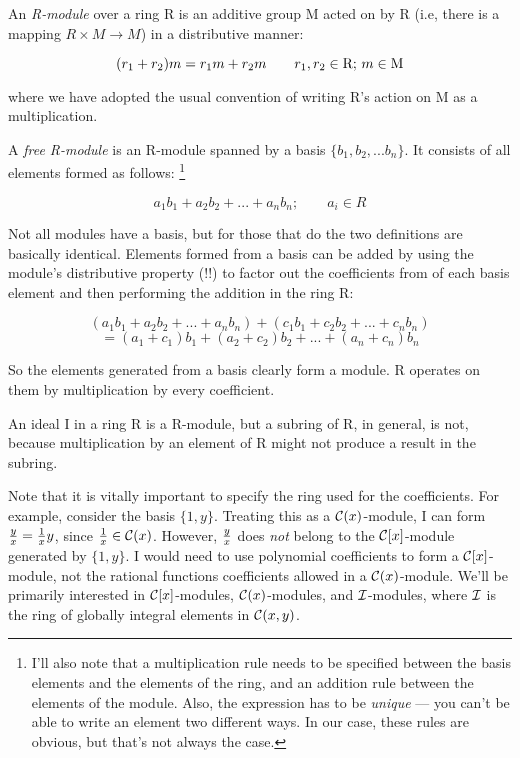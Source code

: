 
An {\it R-module} over a ring R is an additive group M acted on by R
(i.e, there is a mapping $R \times M \to M$) in a distributive manner:

$$(r_1 + r_2)m = r_1 m + r_2 m \qquad r_1, r_2 \in {\rm R};\, m \in {\rm M}$$

where we have adopted the usual convention of writing R's action on M
as a multiplication.

\enddefinition


A {\it free R-module} is an R-module spanned by a basis
$\{b_1, b_2, ... b_n\}$.  It consists of all elements formed as follows:
\footnote{I'll also note that a multiplication rule needs to be specified
between the basis elements and the elements of the ring, and an
addition rule between the elements of the module.  Also,
the expression has to be {\it unique} --- you can't be
able to write an element two different ways.  In our
case, these rules are obvious, but that's not always the case.}

	$$ a_1 b_1 + a_2 b_2 + ... + a_n b_n; \qquad a_i \in R $$


\enddefinition

Not all modules have a basis, but for those that do the two
definitions are basically identical.  Elements formed from a basis can
be added by using the module's distributive property (!!) to factor out the
coefficients from of each basis element and then performing the addition
in the ring R:

$$ (a_1 b_1 + a_2 b_2 + ... + a_n b_n) + (c_1 b_1 + c_2 b_2 + ... + c_n b_n) $$
$$  = (a_1 + c_1) b_1 + (a_2 + c_2) b_2 + ... + (a_n + c_n) b_n $$

So the elements generated from a basis clearly form a module.  R operates
on them by multiplication by every coefficient.

\example \quad

An ideal I in a ring R is a R-module, but a subring of R, in
general, is not, because multiplication by an element of R might
not produce a result in the subring.

\endexample


Note that it is vitally important to specify the ring used for the
coefficients.  For example, consider the basis $\{1, y\}$.  Treating
this as a ${\cal C}(x)$-module, I can form ${y \over x} = {1 \over x}
y$, since ${1 \over x} \in {\cal C}(x)$.  However, $y \over x$ does {\it
not} belong to the ${\cal C}[x]$-module generated by $\{1, y\}$.  I
would need to use polynomial coefficients to form a ${\cal
C}[x]$-module, not the rational functions coefficients allowed in a
${\cal C}(x)$-module.  We'll be primarily interested in ${\cal C}[x]$-modules,
${\cal C}(x)$-modules, and ${\cal I}$-modules, where ${\cal I}$ is the ring
of globally integral elements in ${\cal C}(x,y)$.


